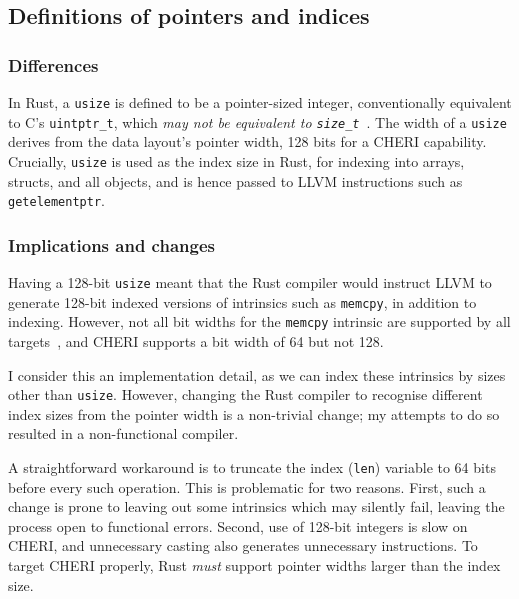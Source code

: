 \documentclass[dissertation.tex]{subfiles}
\begin{document}
\subsection{Definitions of pointers and indices}
\label{sec:rust-usize}

\subsubsection{Differences}
In Rust, a \texttt{usize} is defined to be a pointer-sized integer,
conventionally equivalent to C's \texttt{uintptr\_t}, which \emph{may
not be equivalent to \texttt{size\_t}}~\cite{rust-rfc-isize}.
The width of a \texttt{usize} derives from the data layout's pointer
width, 128 bits for a CHERI capability.
Crucially, \texttt{usize} is used as the index size in Rust, for
indexing into arrays, structs, and all objects, and is hence passed to
LLVM instructions such as \texttt{getelementptr}.

\subsubsection{Implications and changes}
Having a 128-bit \texttt{usize} meant that the Rust compiler would
instruct LLVM to generate 128-bit indexed versions of intrinsics such as
\texttt{memcpy}, in addition to indexing.
However, not all bit widths for the \texttt{memcpy} intrinsic are
supported by all targets~\cite{llvm-langref}, and CHERI supports a bit
width of 64 but not 128.

I consider this an implementation detail, as we can index these
intrinsics by sizes other than \texttt{usize}.
However, changing the Rust compiler to recognise different index sizes
from the pointer width is a non-trivial change; my attempts to do so
resulted in a non-functional compiler.

A straightforward workaround is to truncate the index (\texttt{len})
variable to 64 bits before every such operation.
This is problematic for two reasons.
First, such a change is prone to leaving out some intrinsics which may
silently fail, leaving the process open to functional errors.
Second, use of 128-bit integers is slow on CHERI, and unnecessary
casting also generates unnecessary instructions.
To target CHERI properly, Rust \emph{must} support pointer widths larger
than the index size.
\end{document}
